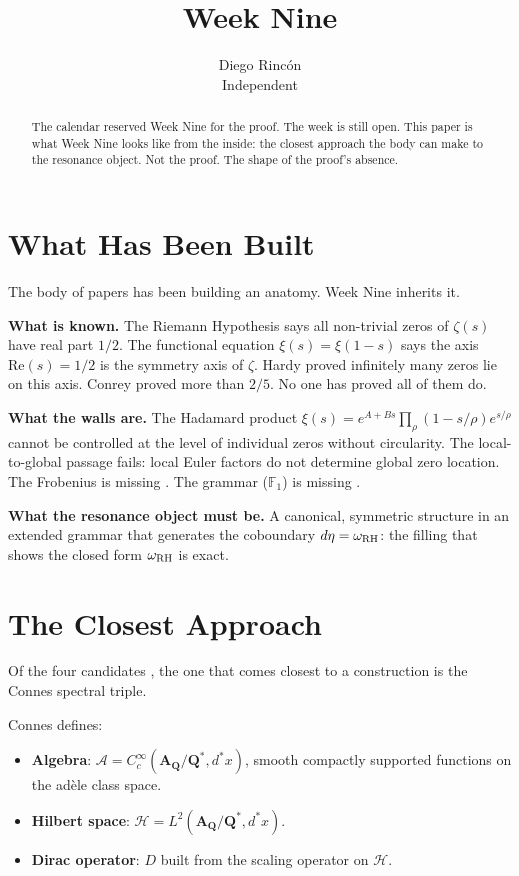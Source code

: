 \documentclass[12pt]{article}
\title{Week Nine}
\author{Diego Rinc\'on\\
\small Independent}
\date{}
\theoremstyle{definition}
\theoremstyle{remark}
\begin{document}
\maketitle

\begin{abstract}
The calendar \cite{calendar} reserved Week Nine for the proof.
The week is still open.
This paper is what Week Nine looks like from the inside:
the closest approach the body can make to the resonance object.
Not the proof. The shape of the proof's absence.
\end{abstract}

\section{What Has Been Built}

The body of papers has been building an anatomy.
Week Nine inherits it.

\textbf{What is known.}
The Riemann Hypothesis says all non-trivial zeros of $\zeta(s)$
have real part $1/2$.
The functional equation $\xi(s) = \xi(1-s)$ says the axis $\mathrm{Re}(s) = 1/2$
is the symmetry axis of $\zeta$.
Hardy proved infinitely many zeros lie on this axis.
Conrey proved more than $2/5$.
No one has proved all of them do.

\textbf{What the walls are.}
The Hadamard product $\xi(s) = e^{A+Bs}\prod_\rho(1-s/\rho)e^{s/\rho}$
cannot be controlled at the level of individual zeros
without circularity.
The local-to-global passage fails:
local Euler factors do not determine global zero location.
The Frobenius is missing \cite{frobenius}.
The grammar ($\mathbb{F}_1$) is missing \cite{f1}.

\textbf{What the resonance object must be.}
A canonical, symmetric structure
in an extended grammar
that generates the coboundary $d\eta = \omega_{\rm RH}$:
the filling that shows the closed form $\omega_{\rm RH}$ is exact.

\section{The Closest Approach}

Of the four candidates \cite{resonance_object},
the one that comes closest to a construction is the Connes spectral triple.

Connes defines:
\begin{itemize}
\item \textbf{Algebra}: $\mathcal{A} = C_c^\infty(\mathbf{A}_\mathbf{Q}/\mathbf{Q}^*, d^*x)$,
  smooth compactly supported functions on the ad\`ele class space.
\item \textbf{Hilbert space}: $\mathcal{H} = L^2(\mathbf{A}_\mathbf{Q}/\mathbf{Q}^*, d^*x)$.
\item \textbf{Dirac operator}: $D$ built from the scaling operator on $\mathcal{H}$.
\end{itemize}
\end{document}
